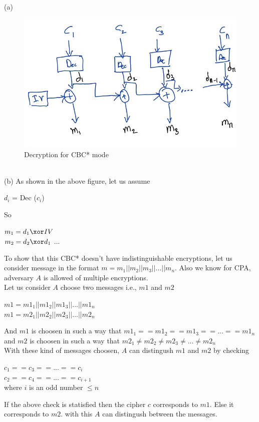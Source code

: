 (a)\\
\begin{figure}[h]
    \includegraphics[width=\textwidth,height=\textheight,keepaspectratio]{6-1 Fig1.jpg}
    \caption{Decryption for CBC* mode}
    \centering
\end{figure}\\
(b) As shown in the above figure, let us assume 

\begin{center}
    $d_i$ = Dec ($c_i$)
\end{center}

So 

\begin{center}
    $m_1 = d_1 \xor IV $\\
    $m_2 = d_2 \xor d_1 $ ...
\end{center}

To show that this CBC* doesn't have indistinguishable encryptions, 
let us consider message in the format $m = m_1|| m_2||m_3|| ... ||m_n$.
Also we know for CPA, adversary $A$ is allowed of multiple encryptions.\\

Let us consider $A$ choose two messages i.e., $m1$ and $m2$ 

\begin{center}
    $m1 = m1_1|| m1_2||m1_3|| ... ||m1_n$\\
    $m1 = m2_1|| m2_2||m2_3|| ... ||m2_n$
\end{center}

And $m1$ is choosen in such a way that $m1_1 ==  m1_2 == m1_3 == ... == m1_n$ and
$m2$ is choosen in such a way that $m2_1 \neq  m2_2 \neq m2_3 \neq ... \neq m2_n$\\

With these kind of messages choosen, $A$ can distingush $m1$ and $m2$ by checking
\begin{center}
    $c_1 == c_3 == ... == c_i$\\
    $c_2 == c_4 == ...  == c_{i+1}$\\
    where $i$ is an odd number $ \leq n$
\end{center}

If the above check is statisfied then the cipher $c$ corresponds to $m1$. Else it corresponds to $m2$.
with this $A$ can distingush between the messages.
